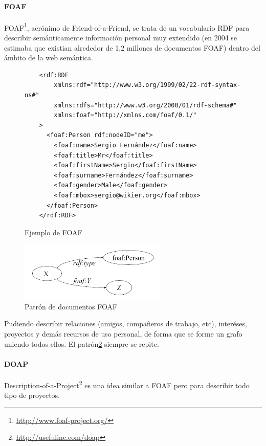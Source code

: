 \paragraph{FOAF}

FOAF\footnote{\url{http://www.foaf-project.org/}}, acrónimo de Friend-of-a-Friend, 
se trata de un vocabulario RDF para describir semánticamente información personal
muy extendido (en 2004 se estimaba\cite{Li2005} que existian alrededor de 1,2 millones 
de documentos FOAF) dentro del ámbito de la web semántica.

\begin{figure} [tp]
\begin{verbatim}
	<rdf:RDF
		xmlns:rdf="http://www.w3.org/1999/02/22-rdf-syntax-ns#"
		xmlns:rdfs="http://www.w3.org/2000/01/rdf-schema#"
		xmlns:foaf="http://xmlns.com/foaf/0.1/"
	>
	  <foaf:Person rdf:nodeID="me">
	    <foaf:name>Sergio Fernández</foaf:name>
	    <foaf:title>Mr</foaf:title>
	    <foaf:firstName>Sergio</foaf:firstName>
	    <foaf:surname>Fernández</foaf:surname>
	    <foaf:gender>Male</foaf:gender>
	    <foaf:mbox>sergio@wikier.org</foaf:mbox>
	  </foaf:Person>
	</rdf:RDF>
\end{verbatim}
	\caption{Ejemplo de FOAF}
	\label{fig:ejemplo.foaf}
\end{figure}

\begin{figure}[tp]
 	\centering
	\includegraphics[width=7cm]{images/patron-foaf.png}
	\caption{Patrón de documentos FOAF}
	\label{fig:patternFOAF}
\end{figure}

Pudiendo describir relaciones (amigos, compañeros de trabajo, etc), interéses,
proyectos y demás recursos de uso personal, de forma que se forme un grafo 
uniendo todos ellos. El patrón\ref{fig:patternFOAF} siempre se repite.

\paragraph{DOAP}

Description-of-a-Project\footnote{\url{http://usefulinc.com/doap}} es una idea 
similar a FOAF pero para describir todo tipo de proyectos.

